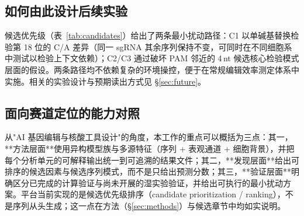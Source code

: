 \subsection{如何由此设计后续实验}

候选优先级（表~\ref{tab:candidates}）给出了两条最小扰动路径：C1 以单碱基替换检验第 18 位的 C/A 差异（同一 sgRNA 其余序列保持不变，可同时在不同细胞系中测试以检验上下文依赖）；C2/C3 通过破坏 PAM 邻近的 4\,nt 候选核心检验模式层面的假设。两条路径均不依赖复杂的环境操控，便于在常规编辑效率测定体系中实施。相关的实验设计与预期读出方式见 \S\ref{sec:future}。

\subsection{面向赛道定位的能力对照}

从"AI 基因编辑与核酸工具设计"的角度，本工作的重点可以概括为三点：其一，**方法层面**使用异构模型族与多源特征（序列 + 表观通道 + 细胞背景），并把每个分析单元的可解释输出统一到可追溯的结果文件；其二，**发现层面**给出可排序的候选因素与候选序列模式，而不是只给出预测分数；其三，**验证层面**明确区分已完成的计算验证与尚未开展的湿实验验证，并给出可执行的最小扰动方案。平台当前实现的是候选优先级排序（candidate prioritization / ranking），不是序列从头生成；这一点在方法（\S\ref{sec:methods}）与候选章节中均如实说明。
